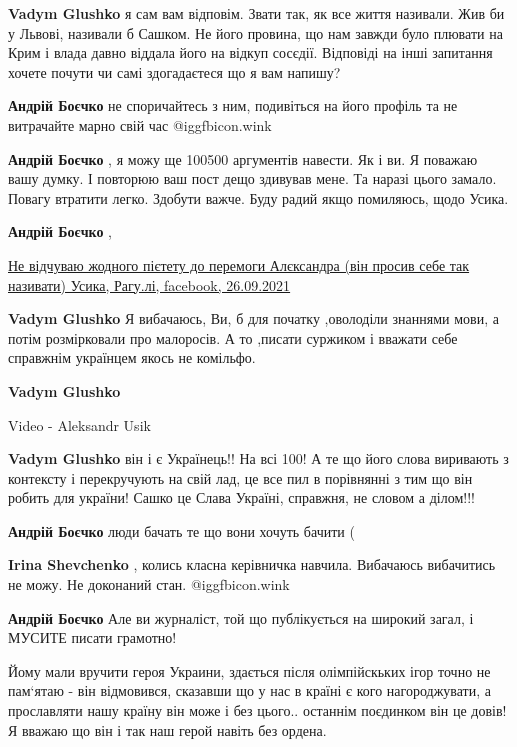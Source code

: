 \begin{itemize}
\begin{itemize}
\textbf{Vadym Glushko} я сам вам відповім. Звати так, як все життя називали. Жив би у Львові, називали б Сашком. Не його провина, що нам завжди було плювати на Крим і влада давно віддала його на відкуп сосєдії. Відповіді на інші запитання хочете почути чи самі здогадаєтеся що я вам напишу?

\textbf{Андрій Боєчко} не споричайтесь з ним, подивіться на його профіль та не витрачайте марно свій час  @igg{fbicon.wink} 

\textbf{Андрій Боєчко} , я можу ще 100500 аргументів навести. Як і ви. Я поважаю вашу думку. І повторюю ваш пост дещо здивував мене. Та наразі цього замало. Повагу втратити легко. Здобути важче. Буду радий якщо помиляюсь, щодо Усика.

\textbf{Андрій Боєчко} , 

\href{https://www.facebook.com/164585046890141/posts/4966019730079958/}{%
Не відчуваю жодного пієтету до перемоги Алєксандра (він просив себе так називати) Усика, %
Рагу.лі, facebook, 26.09.2021%
}

\textbf{Vadym Glushko} Я вибачаюсь, Ви, б для початку ,оволоділи знаннями мови, а потім розмірковали про малоросів. А то ,писати суржиком і вважати себе справжнім українцем якось не комільфо.

\textbf{Vadym Glushko}

Video - Aleksandr Usik

\textbf{Vadym Glushko} він і є Українець!! На всі 100! А те що його слова виривають з контексту і перекручують на свій лад, це все пил в порівнянні з тим що він робить для україни! Сашко це Слава Україні, справжня, не словом а ділом!!!

\textbf{Андрій Боєчко} люди бачать те що вони хочуть бачити (

\textbf{Irina Shevchenko} , колись класна керівничка навчила. Вибачаюсь вибачитись не можу. Не доконаний стан.  @igg{fbicon.wink} 

\textbf{Андрій Боєчко} Але ви журналіст, той що публікується на широкий загал, і МУСИТЕ писати грамотно!
\end{itemize} %


Йому мали вручити героя Украини, здається після олімпійскьких ігор точно не
пам‘ятаю - він відмовився, сказавши що у нас в країні є кого нагороджувати, а
прославляти нашу країну він може і без цього.. останнім поєдинком він це довів!
Я вважаю що він і так наш герой навіть без ордена.


\end{itemize}
